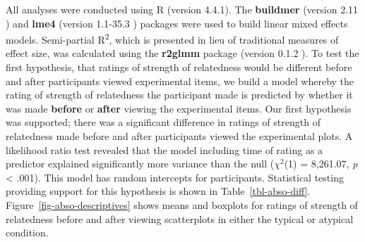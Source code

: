 \documentclass[manuscript,screen,review,anonymous]{acmart}
\begin{document}
All analyses were conducted using R (version 4.4.1). The
\textbf{buildmer} (version 2.11 \citep{buildmer}) and \textbf{lme4}
(version 1.1-35.3 \citep{lme4}) packages were used to build linear mixed
effects models. Semi-partial R\textsuperscript{2}, which is presented in
lieu of traditional measures of effect size, was calculated using the
\textbf{r2glmm} package (version 0.1.2 \citep{r2glmm}). To test the
first hypothesis, that ratings of strength of relatedness would be
different before and after participants viewed experimental items, we
build a model whereby the rating of strength of relatedness the
participant made is predicted by whether it was made \textbf{before} or
\textbf{after} viewing the experimental items. Our first hypothesis was
supported; there was a significant difference in ratings of strength of
relatedness made before and after participants viewed the experimental
plots. A likelihood ratio test revealed that the model including time of
rating as a predictor explained significantly more variance than the
null (\(\chi^2\)(1) = 8,261.07, \emph{p} \textless{} .001). This model
has random intercepts for participants. Statistical testing providing
support for this hypothesis is shown in Table~\ref{tbl-abso-diff}.
Figure~\ref{fig-abso-descriptives} shows means and boxplots for ratings
of strength of relatedness before and after viewing scatterplots in
either the typical or atypical condition.

\begin{table}

\caption{\label{tbl-abso-diff}Statistics for the significant main effect
of rating time. Semi-partial R\textsuperscript{2} is also incuded.}


\end{table}%
\end{document}
